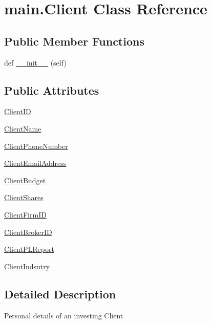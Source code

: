 \hypertarget{classmain_1_1_client}{}\section{main.\+Client Class Reference}
\label{classmain_1_1_client}
\subsection*{Public Member Functions}
\begin{DoxyCompactItemize}
\item 
def \hyperlink{classmain_1_1_client_ad8d53d243e748e03be28ccacfb4b548b}{\+\_\+\+\_\+init\+\_\+\+\_\+} (self)
\end{DoxyCompactItemize}
\subsection*{Public Attributes}
\begin{DoxyCompactItemize}
\item 
\hyperlink{classmain_1_1_client_ad7f6ad05bd5087dd172b8b3f7f5287dc}{Client\+I\+D}
\item 
\hyperlink{classmain_1_1_client_aa1f6fda925660a8554e0cb8b169531cc}{Client\+Name}
\item 
\hyperlink{classmain_1_1_client_a79a42677f33123c894d9d00f12151862}{Client\+Phone\+Number}
\item 
\hyperlink{classmain_1_1_client_a1013d78e3f5c2d75503d4fd229d674c4}{Client\+Email\+Address}
\item 
\hyperlink{classmain_1_1_client_a246a653ffa98367d55d512096654c1a5}{Client\+Budget}
\item 
\hyperlink{classmain_1_1_client_ac367be189adcc4e5fccc5008cd95b30a}{Client\+Shares}
\item 
\hyperlink{classmain_1_1_client_ac38418ecb685cc65eb71c3831247326a}{Client\+Firm\+I\+D}
\item 
\hyperlink{classmain_1_1_client_ac814694355c10e4f0e7ac54343472f4a}{Client\+Broker\+I\+D}
\item 
\hyperlink{classmain_1_1_client_a0a9203d6158520283fe26d6ad94b2cb1}{Client\+P\+L\+Report}
\item 
\hyperlink{classmain_1_1_client_afbfb7f50f04bda76090dcd576134e488}{Client\+Indsutry}
\end{DoxyCompactItemize}


\subsection{Detailed Description}
\begin{DoxyVerb}Personal details of an investing Client\end{DoxyVerb}
 

